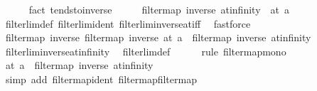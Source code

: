 \begin{isabellebody}
\ \ \ \ \isamarkupfalse%
\ {\isacharparenleft}{\kern0pt}fact\ tendsto{\isacharunderscore}{\kern0pt}inverse{\isacharunderscore}{\kern0pt}{}{\isacharparenright}{\kern0pt}\isanewline
\ \ \isamarkupfalse%
\ \isamarkupfalse%
\ {\isachardoublequoteopen}filtermap\ inverse\ at{\isacharunderscore}{\kern0pt}infinity\ {\isasymle}\ at\ {\isacharparenleft}{\kern0pt}{}{\isacharcolon}{\kern0pt}{\isacharcolon}{\kern0pt}{\isacharprime}{\kern0pt}a{\isacharparenright}{\kern0pt}{\isachardoublequoteclose}\isanewline
\ \ \ \ \isamarkupfalse%
\ filterlim{\isacharunderscore}{\kern0pt}def\ filterlim{\isacharunderscore}{\kern0pt}ident\ filterlim{\isacharunderscore}{\kern0pt}inverse{\isacharunderscore}{\kern0pt}at{\isacharunderscore}{\kern0pt}iff\ \isamarkupfalse%
\ fastforce\isanewline
{}\isamarkupfalse%
\isanewline
\ \ \isamarkupfalse%
\ {\isachardoublequoteopen}filtermap\ inverse\ {\isacharparenleft}{\kern0pt}filtermap\ inverse\ {\isacharparenleft}{\kern0pt}at\ {\isacharparenleft}{\kern0pt}{}{\isacharcolon}{\kern0pt}{\isacharcolon}{\kern0pt}{\isacharprime}{\kern0pt}a{\isacharparenright}{\kern0pt}{\isacharparenright}{\kern0pt}{\isacharparenright}{\kern0pt}\ {\isasymle}\ filtermap\ inverse\ at{\isacharunderscore}{\kern0pt}infinity{\isachardoublequoteclose}\isanewline
\ \ \ \ \isamarkupfalse%
\ filterlim{\isacharunderscore}{\kern0pt}inverse{\isacharunderscore}{\kern0pt}at{\isacharunderscore}{\kern0pt}infinity\ \isamarkupfalse%
\ filterlim{\isacharunderscore}{\kern0pt}def\isanewline
\ \ \ \ \isamarkupfalse%
\ {\isacharparenleft}{\kern0pt}rule\ filtermap{\isacharunderscore}{\kern0pt}mono{\isacharparenright}{\kern0pt}\isanewline
\ \ \isamarkupfalse%
\ \isamarkupfalse%
\ {\isachardoublequoteopen}at\ {\isacharparenleft}{\kern0pt}{}{\isacharcolon}{\kern0pt}{\isacharcolon}{\kern0pt}{\isacharprime}{\kern0pt}a{\isacharparenright}{\kern0pt}\ {\isasymle}\ filtermap\ inverse\ at{\isacharunderscore}{\kern0pt}infinity{\isachardoublequoteclose}\isanewline
\ \ \ \ \isamarkupfalse%
\ {\isacharparenleft}{\kern0pt}simp\ add{\isacharcolon}{\kern0pt}\ filtermap{\isacharunderscore}{\kern0pt}ident\ filtermap{\isacharunderscore}{\kern0pt}filtermap{\isacharparenright}{\kern0pt}\isanewline
{}\isamarkupfalse%
%
\endisatagproof
{\isafoldproof}%
%
\isadelimproof
\isanewline
%
\endisadelimproof
\isanewline
{}\isamarkupfalse%

\end{isabellebody}
